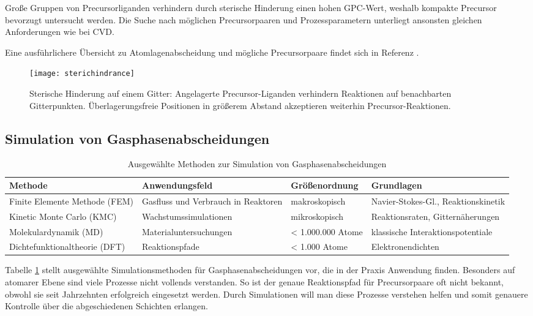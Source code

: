 Große Gruppen von Precursorliganden verhindern durch sterische Hinderung einen hohen GPC-Wert, weshalb kompakte Precursor bevorzugt untersucht werden. 
Die Suche nach möglichen Precursorpaaren und Prozessparametern unterliegt ansonsten gleichen Anforderungen wie bei CVD.

Eine ausführlichere Übersicht zu Atomlagenabscheidung und mögliche Precursorpaare findet sich in Referenz \cite{puurunen_surface_2005}.

\begin{figure}
  \centering
  \texttt{[image: sterichindrance]}
  \caption[Sterische Hinderung]{Sterische Hinderung auf einem Gitter:
    Angelagerte Precursor-Liganden verhindern Reaktionen auf benachbarten Gitterpunkten.
    Überlagerungsfreie Positionen in größerem Abstand akzeptieren weiterhin Precursor-Reaktionen.
  }
  \label{fig:steric}
\end{figure}

\subsection{Simulation von Gasphasenabscheidungen}

\begin{table}
  \centering
  \begin{tabularx}{\textwidth}{XXXX}
    \hline
    Methode & Anwendungsfeld & Größenordnung & Grundlagen \\
    \hline
    Finite Elemente Methode (FEM) & Gasfluss und Verbrauch in Reaktoren & makroskopisch & Navier-Stokes-Gl., Reaktionskinetik \\
    Kinetic Monte Carlo (KMC) & Wachstums\-simulationen & mikroskopisch & Reaktionsraten, Gitternäherungen \\
    Molekular\-dynamik (MD) & Material\-unter\-suchungen & < 1.000.000 Atome & klassische Interaktionspotentiale \\
    Dichte\-funktional\-theorie (DFT) & Reaktionspfade & < 1.000 Atome & Elektronendichten \\
    \hline
  \end{tabularx}
  \caption[Ausgewählte Methoden zur Simulation von Gasphasenabscheidungen]{Ausgewählte Methoden zur Simulation von Gasphasenabscheidungen}
  \label{tab:deposition-simulations}
\end{table}

Tabelle \ref{tab:deposition-simulations} stellt ausgewählte Simulationsmethoden für Gasphasenabscheidungen vor, die in der Praxis Anwendung finden.
Besonders auf atomarer Ebene sind viele Prozesse nicht vollends verstanden.
So ist der genaue Reaktionspfad für Precursorpaare oft nicht bekannt, obwohl sie seit Jahrzehnten erfolgreich eingesetzt werden.
Durch Simulationen will man diese Prozesse verstehen helfen und somit genauere Kontrolle über die abgeschiedenen Schichten erlangen.

